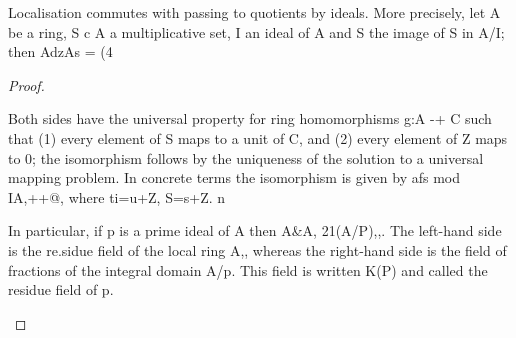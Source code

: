 \begin{theorem}[Theorem 4.2]\label{mcrt-auto-theorem-4-2}\uses{}
\begin{mathematicalrecord}
Localisation commutes with passing to quotients by ideals.
More precisely, let A be a ring, S c A a multiplicative set, I an ideal of A
and S the image of S in A/I; then
          AdzAs = (4%
\end{mathematicalrecord}
\end{theorem}
\begin{proof}
\begin{mathematicalrecord}
Both sides have the universal property for ring homomorphisms
g:A -+ C such that
      (1) every element of S maps to a unit of C,
and (2) every element of Z maps to 0;
the isomorphism follows by the uniqueness of the solution to a universal
mapping problem. In concrete terms the isomorphism is given by
          afs mod IA,++@,        where ti=u+Z,    S=s+Z.    n

   In particular, if p is a prime ideal of A then
          A&A, 21(A/P),,.
The left-hand side is the re.sidue field of the local ring A,, whereas the
right-hand side is the field of fractions of the integral domain A/p. This
field is written K(P) and called the residue field of p.
\end{mathematicalrecord}
\end{proof}


